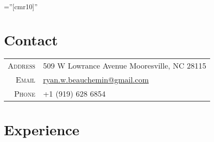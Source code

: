 \documentclass[a4paper,10pt]{article} %
\begin{document}
\pagestyle{empty} %

\font\fb=''[cmr10]'' %

\par{\par\bigskip}

\section{Contact} %

\begin{tabular}{r|l}
\textsc{Address} & 509 W Lowrance Avenue Mooresville, NC 28115 \\
\textsc{Email} & \href{mailto:ryan.w.beauchemin@gmail.com}{ryan.w.beauchemin@gmail.com}\\
\textsc{Phone} & +1 (919) 628 6854\\
\end{tabular}
\bigskip


\section{Experience} %
\end{document}
